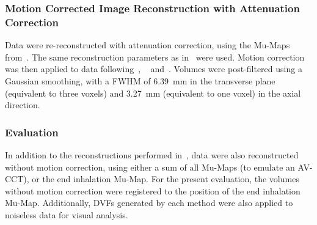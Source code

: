             \subsubsection{Motion Corrected Image Reconstruction with Attenuation Correction} \label{sec:comparison_of_motion_correction_methods_incorporating_motion_modelling_for_pet_ct_using_a_single_breath_hold_attenuation_map_attenuation_corrected_image_reconstruction}
                Data were re-reconstructed with attenuation correction, using the \glspl{Mu-Map} from~. The same reconstruction parameters as in~ were used. Motion correction was then applied to data following~, ~ and~. Volumes were post-filtered using a Gaussian smoothing, with a \gls{FWHM} of \SI{6.39}{\milli\metre} in the transverse plane (equivalent to three voxels) and \SI{3.27}{\milli\metre} (equivalent to one voxel) in the axial direction.
            
            \subsubsection{Evaluation} \label{sec:comparison_of_motion_correction_methods_incorporating_motion_modelling_for_pet_ct_using_a_single_breath_hold_attenuation_map_evaluation}
                In addition to the reconstructions performed in~, data were also reconstructed without motion correction, using either a sum of all \glspl{Mu-Map} (to emulate an \gls{AV-CCT}), or the end inhalation \gls{Mu-Map}. For the present evaluation, the volumes without motion correction were registered to the position of the end inhalation \gls{Mu-Map}. Additionally, \glspl{DVF} generated by each method were also applied to noiseless data for visual analysis.
                
